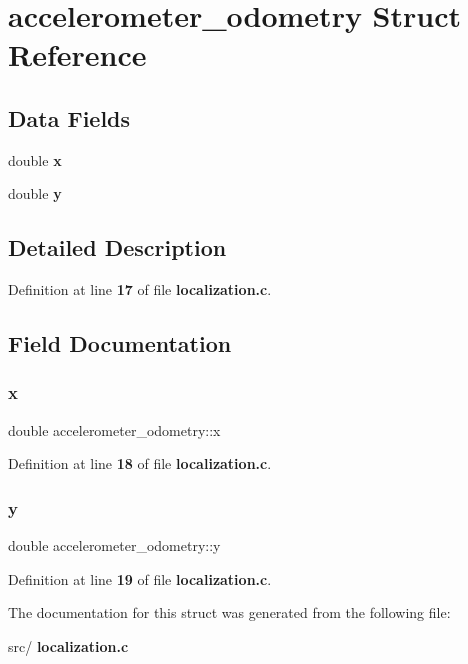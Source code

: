 \section{accelerometer\+\_\+odometry Struct Reference}
\label{structaccelerometer__odometry}
\subsection*{Data Fields}
\begin{DoxyCompactItemize}
\item 
double \textbf{ x}
\item 
double \textbf{ y}
\end{DoxyCompactItemize}


\subsection{Detailed Description}


Definition at line \textbf{ 17} of file \textbf{ localization.\+c}.



\subsection{Field Documentation}
\mbox{\label{structaccelerometer__odometry_a83af671d99413a7c480678d5abb9c64a}} 
\subsubsection{x}
{\footnotesize\ttfamily double accelerometer\+\_\+odometry\+::x}



Definition at line \textbf{ 18} of file \textbf{ localization.\+c}.

\mbox{\label{structaccelerometer__odometry_a4d812f516efdd477ae9f74fca2a07a2b}} 
\subsubsection{y}
{\footnotesize\ttfamily double accelerometer\+\_\+odometry\+::y}



Definition at line \textbf{ 19} of file \textbf{ localization.\+c}.



The documentation for this struct was generated from the following file\+:\begin{DoxyCompactItemize}
\item 
src/\textbf{ localization.\+c}\end{DoxyCompactItemize}
